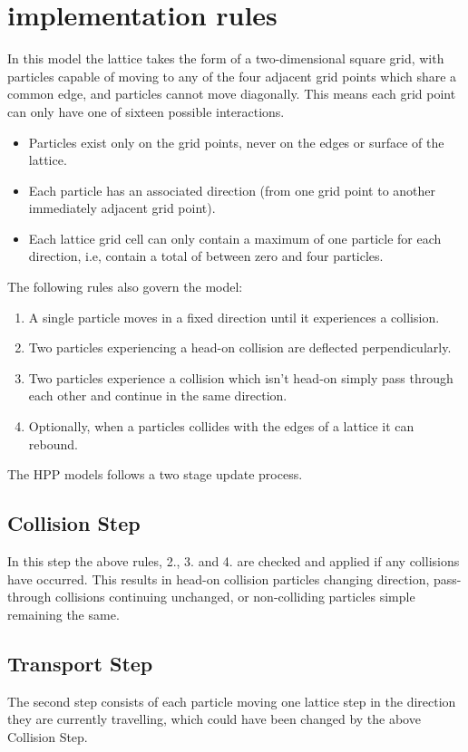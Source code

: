 \documentclass[paper=a4, fontsize=11pt]{scrartcl} %
\numberwithin{equation}{section} %
\numberwithin{figure}{section} %
\numberwithin{table}{section} %
\begin{document}
\section{implementation rules}
In this model the lattice takes the form of a two-dimensional square grid, with particles capable of moving to any of the four adjacent grid points which share a common edge, and particles cannot move diagonally. This means each grid point can only have one of sixteen possible interactions.
\begin{itemize}
	\item Particles exist only on the grid points, never on the edges or surface of the lattice.
	\item Each particle has an associated direction (from one grid point to another immediately adjacent grid point).
	\item Each lattice grid cell can only contain a maximum of one particle for each direction, i.e, contain a total of between zero and four particles.
\end{itemize}
The following rules also govern the model:
\begin{enumerate}
	\item A single particle moves in a fixed direction until it experiences a collision.
	\item Two particles experiencing a head-on collision are deflected perpendicularly.
	\item Two particles experience a collision which isn't head-on simply pass through each other and continue in the same direction.
	\item Optionally, when a particles collides with the edges of a lattice it can rebound.
\end{enumerate}
The HPP models follows a two stage update process.

\subsection{Collision Step}
In this step the above rules, 2., 3. and 4. are checked and applied if any collisions have occurred. This results in head-on collision particles changing direction, pass-through collisions continuing unchanged, or non-colliding particles simple remaining the same.

\subsection{Transport Step}
The second step consists of each particle moving one lattice step in the direction they are currently travelling, which could have been changed by the above Collision Step.
\end{document}

